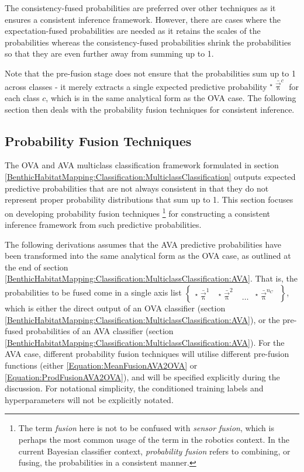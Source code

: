 				The consistency-fused probabilities are preferred over other techniques as it ensures a consistent inference framework. However, there are cases where the expectation-fused probabilities are needed as it retains the scales of the probabilities whereas the consistency-fused probabilities shrink the probabilities so that they are even further away from summing up to 1.
				 
				Note that the pre-fusion stage does not ensure that the probabilities sum up to 1 across classes - it merely extracts a single expected predictive probability ${^{\star}}\bar{\vec{\uppi}}^{c}$ for each class $c$, which is in the same analytical form as the OVA case. The following section then deals with the probability fusion techniques for consistent inference.
				
		\subsection{Probability Fusion Techniques}
		\label{BenthicHabitatMapping:Classification:ProbabilityFusion}
			
			The OVA and AVA multiclass classification framework formulated in section \ref{BenthicHabitatMapping:Classification:MulticlassClassification} outputs expected predictive probabilities that are not always consistent in that they do not represent proper probability distributions that sum up to 1. This section focuses on developing probability fusion techniques \footnote{The term \textit{fusion} here is not to be confused with \textit{sensor fusion}, which is perhaps the most common usage of the term in the robotics context. In the current Bayesian classifier context, \textit{probability fusion} refers to combining, or fusing, the probabilities in a consistent manner.} for constructing a consistent inference framework from such predictive probabilities.
			
			The following derivations assumes that the AVA predictive probabilities have been transformed into the same analytical form as the OVA case, as outlined at the end of section \ref{BenthicHabitatMapping:Classification:MulticlassClassification:AVA}. That is, the probabilities to be fused come in a single axis list $\begin{Bmatrix*} {^{\star}}\bar{\vec{\uppi}}^{1} & {^{\star}}\bar{\vec{\uppi}}^{2} & \dots & {^{\star}}\bar{\vec{\uppi}}^{n_{C}} \end{Bmatrix*}$, which is either the direct output of an OVA classifier (section \ref{BenthicHabitatMapping:Classification:MulticlassClassification:AVA}), or the pre-fused probabilities of an AVA classifier (section \ref{BenthicHabitatMapping:Classification:MulticlassClassification:AVA}). For the AVA case, different probability fusion techniques will utilise different pre-fusion functions (either \eqref{Equation:MeanFusionAVA2OVA} or \eqref{Equation:ProdFusionAVA2OVA}), and will be specified explicitly during the discussion. For notational simplicity, the conditioned training labels and hyperparameters will not be explicitly notated.
		
